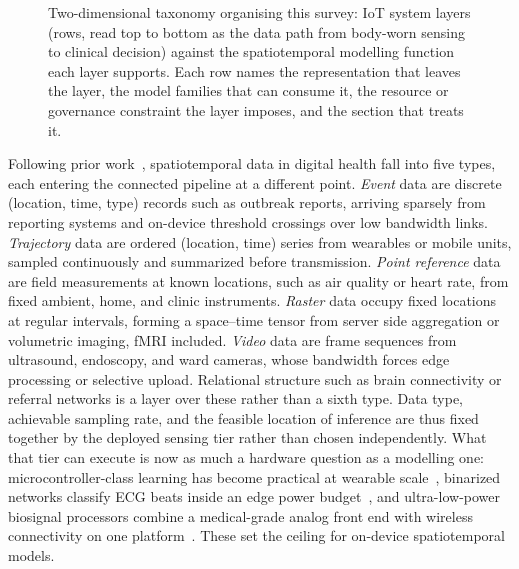 \documentclass[journal]{IEEEtran}
\providecommand{\Description}[1]{}
\newif\ifsubmission
\begin{document}
\begin{figure}[t]
\caption{Two-dimensional taxonomy organising this survey: IoT system layers (rows, read top to bottom as the data path from body-worn sensing to clinical decision) against the spatiotemporal modelling function each layer supports. Each row names the representation that leaves the layer, the model families that can consume it, the resource or governance constraint the layer imposes, and the section that treats it. }
\Description{A five-row by four-column grid. Rows are IoT system layers from sensing and device, through communication, edge gateway and cloud platform, to twin and decision. Columns give the data representation leaving each layer, the spatiotemporal model families that consume it, the constraint the layer imposes, and the section of the paper covering it.}
\label{fig:taxonomy}
\end{figure}

\ifsubmission
Following prior work~\cite{wang2022deep,atluri2018stdm}, spatiotemporal data in digital health fall into five types, each entering the connected pipeline at a different point. \emph{Event} data are discrete (location, time, type) records such as outbreak reports, arriving sparsely from reporting systems and on-device threshold crossings over low bandwidth links. \emph{Trajectory} data are ordered (location, time) series from wearables or mobile units, sampled continuously and summarized before transmission. \emph{Point reference} data are field measurements at known locations, such as air quality or heart rate, from fixed ambient, home, and clinic instruments. \emph{Raster} data occupy fixed locations at regular intervals, forming a space--time tensor from server side aggregation or volumetric imaging, fMRI included. \emph{Video} data are frame sequences from ultrasound, endoscopy, and ward cameras, whose bandwidth forces edge processing or selective upload. Relational structure such as brain connectivity or referral networks is a layer over these rather than a sixth type. Data type, achievable sampling rate, and the feasible location of inference are thus fixed together by the deployed sensing tier rather than chosen independently. What that tier can execute is now as much a hardware question as a modelling one: microcontroller-class learning has become practical at wearable scale~\cite{saha2022mcuml}, binarized networks classify ECG beats inside an edge power budget~\cite{wong2022binarizedecg}, and ultra-low-power biosignal processors combine a medical-grade analog front end with wireless connectivity on one platform~\cite{frey2023biogap}. These set the ceiling for on-device spatiotemporal models.
\end{document}
